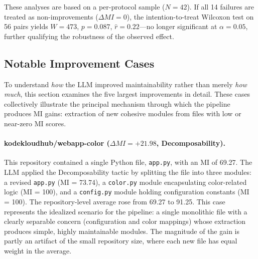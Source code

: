 \documentclass[sigconf,review,anonymous]{acmart}
\begin{document}
These analyses are based on a per-protocol sample ($N = 42$). If all 14 failures are treated as non-improvements ($\Delta MI = 0$), the intention-to-treat Wilcoxon test on 56 pairs yields $W = 473$, $p = 0.087$, $\hat{r} = 0.22$---no longer significant at $\alpha = 0.05$, further qualifying the robustness of the observed effect.

\subsection{Notable Improvement Cases}
\label{subsec:exp5_cases}

To understand \textit{how} the LLM improved maintainability rather than merely \textit{how much}, this section examines the five largest improvements in detail. These cases collectively illustrate the principal mechanism through which the pipeline produces MI gains: extraction of new cohesive modules from files with low or near-zero MI scores.

\paragraph{kodekloudhub/webapp-color ($\Delta MI = +21.98$, Decomposability).}
This repository contained a single Python file, \texttt{app.py}, with an MI of 69.27. The LLM applied the Decomposability tactic by splitting the file into three modules: a revised \texttt{app.py} (MI = 73.74), a \texttt{color.py} module encapsulating color-related logic (MI = 100), and a \texttt{config.py} module holding configuration constants (MI = 100). The repository-level average rose from 69.27 to 91.25. This case represents the idealized scenario for the pipeline: a single monolithic file with a clearly separable concern (configuration and color mappings) whose extraction produces simple, highly maintainable modules. The magnitude of the gain is partly an artifact of the small repository size, where each new file has equal weight in the average.
\end{document}

